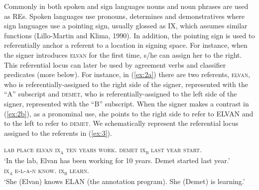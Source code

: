 \documentclass[]{elsarticle} %
\begin{document}
Commonly in both spoken and sign languages nouns and noun phrases are
used as REs. Spoken languages use pronouns, determines and
demonstratives where sign languages use a pointing sign, usually glossed
as IX, which assumes similar functions (Lillo-Martin and Klima, 1990).
In addition, the pointing sign is used to referentially anchor a
referent to a location in signing space. For instance, when the signer
introduces \textsc{elvan} for the first time, s/he can assign her to the
right. This referential locus can later be used by agreement verbs and
classifier predicates (more below). For instance, in (\ref{ex:2a}) there
are two referents, \textsc{elvan}, who is referentially-assigned to the
right side of the signer, represented with the ``A'' subscript and
\textsc{demet}, who is referentially-assigned to the left side of the
signer, represented with the ``B'' subscript. When the signer makes a
contrast in (\ref{ex:2b}), as a pronominal use, she points to the right
side to refer to ELVAN and to the left to refer to \textsc{demet}. We
schematically represent the referential locus assigned to the referents
in (\ref{ex:3}).

\begin{exe}
    \ex 
\begin{xlist}
    \ex \label{ex:2a}
    \textsc{lab place elvan ix\textsubscript{a} ten years work. demet ix\textsubscript{b} last year start.} \\
    ‘In the lab, Elvan has been working for 10 years. Demet started last year.’
    \\
    \ex \label{ex:2b}
    \textsc{ix\textsubscript{a} e-l-a-n know. ix\textsubscript{b} learn.}\\
    ‘She (Elvan) knows ELAN (the annotation program). She (Demet) is learning.’
    \end{xlist}
    \end{exe}
\end{document}
